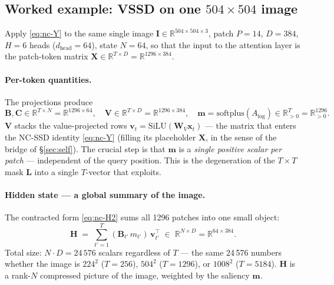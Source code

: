 \documentclass[11pt,a4paper]{article}
\begin{document}
\subsection{Worked example: VSSD on one $504\!\times\!504$ image}
\label{sec:vssd-worked}

Apply \eqref{eq:nc-Y} to the same single image
$\bm{I}\in\mathbb{R}^{504\times 504\times 3}$, patch $P=14$, $D=384$,
$H=6$ heads ($d_{\text{head}}=64$), state $N=64$, so that the input to
the attention layer is the patch-token matrix
$\bm{X}\in\mathbb{R}^{T\times D}=\mathbb{R}^{1296\times 384}$.

\paragraph{Per-token quantities.}
The projections produce
\begin{equation}
  \bm{B},\bm{C}\in\mathbb{R}^{T\times N}=\mathbb{R}^{1296\times 64},
  \quad
  \bm{V}\in\mathbb{R}^{T\times D}=\mathbb{R}^{1296\times 384},
  \quad
  \bm{m} = \mathrm{softplus}(A_{\log})\in\mathbb{R}_{>0}^{T}=\mathbb{R}_{>0}^{1296}.
\end{equation}
$\bm{V}$ stacks the value-projected rows $\bm{v}_t =
\mathrm{SiLU}(\bm{W}_V\bm{x}_t)$ — the matrix that enters the NC-SSD
identity \eqref{eq:nc-Y} (filling its placeholder $\bm{X}$, in the
sense of the bridge of \S\ref{sec:self}).
The crucial step is that $\bm{m}$ is a \emph{single positive scalar
per patch} — independent of the query position. This is the
degeneration of the $T\!\times\!T$ mask $\bm{L}$ into a single
$T$-vector that \cite{vssd} exploits.

\paragraph{Hidden state — a global summary of the image.}
The contracted form \eqref{eq:nc-H2} sums all 1296 patches into one
small object:
\begin{equation}\label{eq:vssd-worked-H}
  \bm{H}
   \;=\; \sum_{t'=1}^{T} (\bm{B}_{t'}\,m_{t'})\,\bm{v}_{t'}^\top
   \;\in\;\mathbb{R}^{N\times D} = \mathbb{R}^{64\times 384}.
\end{equation}
Total size: $N\!\cdot\!D = 24\,576$ scalars regardless of $T$ — the
same 24\,576 numbers whether the image is $224^{2}$ ($T\!=\!256$),
$504^{2}$ ($T\!=\!1296$), or $1008^{2}$ ($T\!=\!5184$). $\bm{H}$ is a
rank-$N$ compressed picture of the image, weighted by the saliency
$\bm{m}$.
\end{document}
